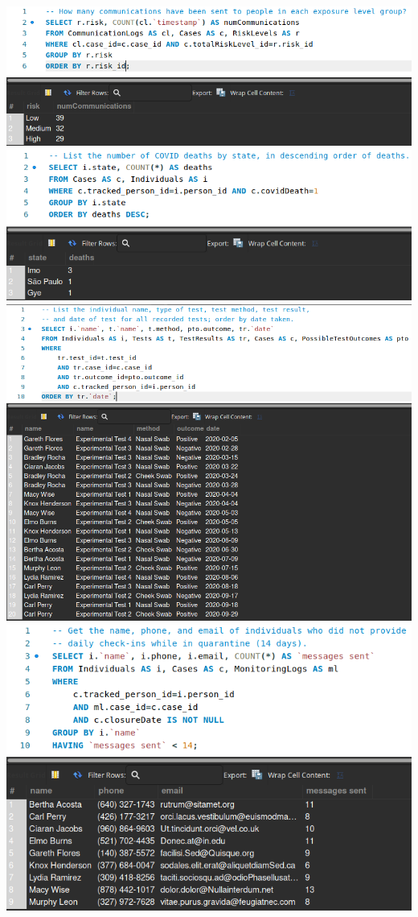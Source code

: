 \documentclass[
]{article}
\begin{document}
\includegraphics{imgs/Query_Evan1.png}\\
\includegraphics{imgs/Query_Evan2.png}\\
\includegraphics{imgs/Query_Evan3.png}\\
\includegraphics{imgs/Query_Evan4.png}\\
\end{document}
